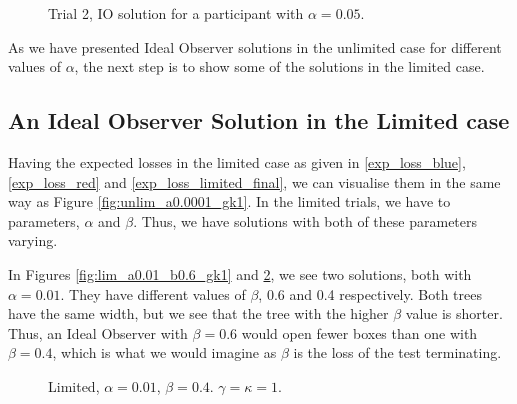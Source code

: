 \begin{figure}
    \centering
    \begin{minipage}{0.45\textwidth}
        \centering
        \scalebox{0.5}{}
        \caption[IO solution for Trial 2. $\alpha=0.01$,$\gamma=\kappa=1$]{Trial 2, IO solution for a participant with $\alpha = 0.01$.}
        \label{fig:IO_trial2_a0.01}
    \end{minipage}\hfill
    \begin{minipage}{0.45\textwidth}
        \centering
        \scalebox{0.5}{}
        \caption[IO solution for Trial 2. $\alpha=0.05$,$\gamma=\kappa=1$]{Trial 2, IO solution for a participant with $\alpha = 0.05$.}
        \label{fig:IO_trial2_a0.05}
    \end{minipage}
\end{figure}

As we have presented Ideal Observer solutions in the unlimited case for different values of $\alpha$, the next step is to show some of the solutions in the limited case. 

\subsection{An Ideal Observer Solution in the Limited case}
Having the expected losses in the limited case as given in \eqref{exp_loss_blue}, \eqref{exp_loss_red} and \eqref{exp_loss_limited_final}, we can visualise them in the same way as Figure \ref{fig:unlim_a0.0001_gk1}. In the limited trials, we have to parameters, $\alpha$ and $\beta$. Thus, we have solutions with both of these parameters varying. 

In Figures \ref{fig:lim_a0.01_b0.6_gk1} and \ref{fig:lim_a0.01_b0.4_gk1}, we see two solutions, both with $\alpha=0.01$. They have different values of $\beta$, 0.6 and 0.4 respectively. Both trees have the same width, but we see that the tree with the higher $\beta$ value is shorter. Thus, an Ideal Observer with $\beta=0.6$ would open fewer boxes than one with $\beta=0.4$, which is what we would imagine as $\beta$ is the loss of the test terminating. 
\begin{figure}
    \centering
    \begin{minipage}[t]{0.45\textwidth}
        \centering
        \scalebox{0.8}{}
        \caption[Limited something]{Limited, $\alpha=0.01$, $\beta=0.6$. $\gamma=\kappa=1$.}
        \label{fig:lim_a0.01_b0.6_gk1}
    \end{minipage}\hfill
    \begin{minipage}[t]{0.45\textwidth}
        \centering
        \scalebox{0.8}{}
        \caption[Limited something]{Limited, $\alpha=0.01$, $\beta=0.4$. $\gamma=\kappa=1$.}
        \label{fig:lim_a0.01_b0.4_gk1}
    \end{minipage}
\end{figure}


